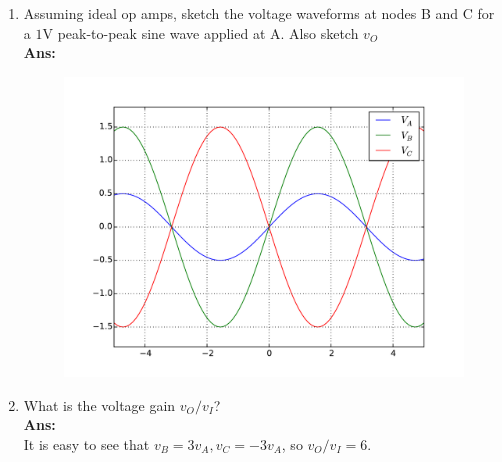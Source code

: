 \documentclass[12pt, a4paper]{article}
\newcommand{\svol}{\si{\volt}}
\newcommand{\Ans}{{\\ \bf Ans:} \\}
\begin{document}
\begin{enumerate}[label=(\alph*)]
  \item Assuming ideal op amps, sketch the voltage waveforms at nodes B and C for a $1\svol$ peak-to-peak sine wave applied at A. Also sketch $v_O$
  \Ans
  \begin{figure}[H]
    \centering
    \includegraphics[width=.6\textwidth]{2_66.pdf}
  \end{figure}
\item What is the voltage gain $v_O / v_I$?
  \Ans It is easy to see that $v_B = 3 v_A, v_C = -3 v_A$, so $v_O / v_I = 6$.
\end{enumerate}
\end{document}
